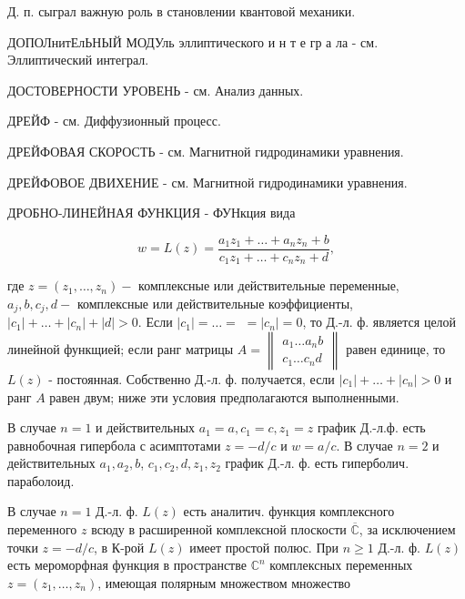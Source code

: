 \documentclass[10pt]{article}
\begin{document}
Д. п. сыграл важную роль в становлении квантовой механики.



ДОПОЛнитЕлЬНЫЙ МОДУль эллиптического и н т е гр а ла - см. Эллиптический интеграл.



ДОСТОВЕРНОСТИ УРОВЕНЬ - см. Анализ данных.



ДРЕЙФ - см. Диффузионный процесс.



ДРЕЙФОВАЯ СКОРОСТЬ - см. Магнитной гидродинамики уравнения.



ДРЕЙФОВОЕ ДВИХЕНИЕ - см. Магнитной гидродинамики уравнения.



ДРОБНО-ЛИНЕЙНАЯ ФУНКЦИЯ - ФУНкция вида



\[

w=L(z)=\frac{a_{1} z_{1}+\ldots+a_{n} z_{n}+b}{c_{1} z_{1}+\ldots+c_{n} z_{n}+d},

\]



где $z=\left(z_{1}, \ldots, z_{n}\right)-$ комплексные или действительные переменные, $a_{j}, b, c_{j}, d-$ комплексные или действительные коэффициенты, $\left|c_{1}\right|+\ldots+\left|c_{n}\right|+|d|>0$. Если $\left|c_{1}\right|=\ldots=$ $=\left|c_{n}\right|=0$, то Д.-л. ф. является целой линейной функщией; если ранг матрицы $A=\left\|\begin{array}{l}a_{1} \ldots a_{n} b \\ c_{1} \ldots c_{n} d\end{array}\right\|$ равен единице, то $L(z)$ - постоянная. Собственно Д.-л. ф. получается, если $\left|c_{1}\right|+\ldots+\left|c_{n}\right|>0$ и ранг $A$ равен двум; ниже эти условия предполагаются выполненными.



В случае $n=1$ и действительных $a_{1}=a, c_{1}=c, z_{1}=z$ график Д.-л.ф. есть равнобочная гипербола с асимптотами $z=-d / c$ и $w=a / c$. В случае $n=2$ и действительных $a_{1}, a_{2}, b$, $c_{1}, c_{2}, d, z_{1}, z_{2}$ график Д.-л. ф. есть гиперболич. параболоид.



В случае $n=1$ Д.-л. ф. $L(z)$ есть аналитич. функция комплексного переменного $z$ всюду в расширенной комплексной плоскости $\overline{\mathbb{C}}$, за исключением точки $z=-d / c$, в К-рой $L(z)$ имеет простой полюс. При $n \geqslant 1$ Д.-л. ф. $L(z)$ есть мероморфная функция в пространстве $\mathbb{C}^{n}$ комплексных переменных $z=\left(z_{1}, \ldots, z_{n}\right)$, имеющая полярным множеством множество
\end{document}
